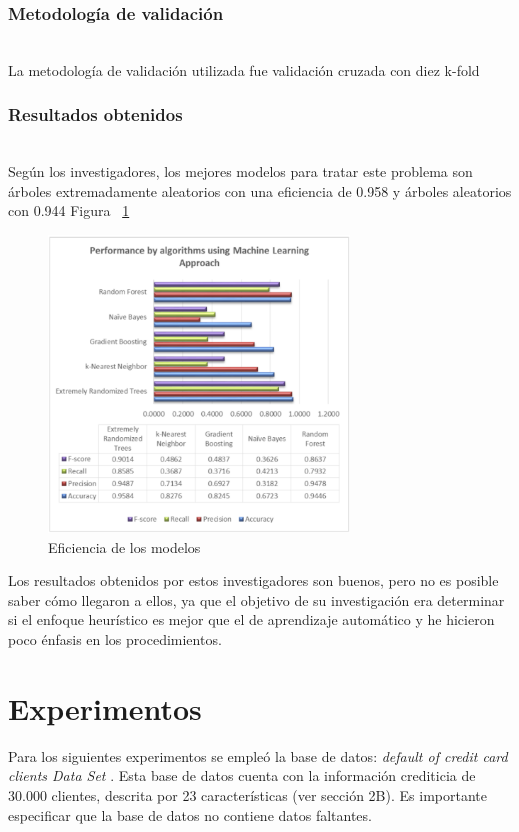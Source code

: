 \documentclass[conference]{IEEEtran}
\begin{document}
\subsubsection{Metodología de validación}\hfill\\
La metodología de validación utilizada fue validación cruzada con diez k-fold

\subsubsection{Resultados obtenidos}\hfill\\
Según los investigadores, los mejores modelos para tratar este problema son árboles extremadamente aleatorios con una eficiencia de 0.958 y árboles aleatorios con 0.944 Figura ~\ref{fig:Accuracy_3}\\ 

\begin{center}
    \begin{figure}[h]
        \hfill
            \includegraphics[width=8cm]{Accuracy_3.png}\hspace*{\fill}
    \caption{Eficiencia de los modelos}
    \label{fig:Accuracy_3}
    \end{figure}
\end{center}

 Los resultados obtenidos por estos investigadores son buenos, pero no es posible saber cómo llegaron a ellos, ya que el objetivo de su investigación era determinar si el enfoque heurístico es mejor que el de aprendizaje automático y he hicieron poco énfasis en los procedimientos.

\section{Experimentos}
  Para los siguientes experimentos se empleó la base de datos: \textit{default of credit card clients Data Set} \cite{bd}. Esta base de datos cuenta con la información crediticia de 30.000 clientes, descrita por  23 características (ver sección 2B). Es importante especificar que la base de datos no contiene datos faltantes.
\end{document}

